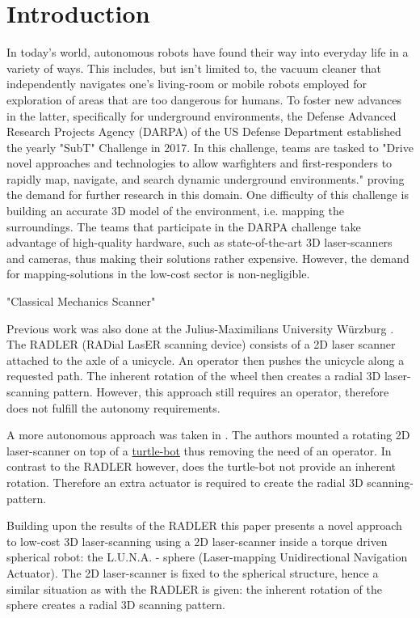 \section{Introduction}
\label{sec:introduction}

In today's world, autonomous robots have found their way into everyday life in a variety of ways. This includes, but isn't limited to, the vacuum cleaner that independently navigates one's living-room or mobile robots employed for exploration of areas that are too dangerous for humans. To foster new advances in the latter, specifically for underground environments, the  Defense Advanced Research Projects Agency (DARPA) of the US Defense Department established the yearly "SubT" Challenge in 2017. In this challenge, teams are tasked to "Drive novel approaches and technologies to allow warfighters and first-responders to rapidly map, navigate, and search dynamic underground environments."  \cite{allen} proving the demand for further research in this domain. One difficulty of this challenge is building an accurate 3D model of the environment, i.e. mapping the surroundings. The teams that participate in the DARPA challenge take advantage of high-quality hardware, such as state-of-the-art 3D laser-scanners and cameras, thus making their solutions rather expensive. However, the demand for mapping-solutions in the low-cost sector is non-negligible. 

"Classical Mechanics Scanner" \cite{classical_mechanics_scanner}

Previous work was also done at the Julius-Maximilians University W\"urzburg \cite{ISER2018}. The RADLER (RADial LasER scanning device) consists of a 2D laser scanner attached to the axle of a unicycle. An operator then pushes the unicycle along a requested path. The inherent rotation of the wheel then creates a radial 3D laser-scanning pattern. However, this approach still requires an operator, therefore does not fulfill the autonomy requirements. 

A more autonomous approach was taken in \cite{3D_per_2D_based}. The authors mounted a rotating 2D laser-scanner on top of a \href{https://www.turtlebot.com}{turtle-bot} thus removing the need of an operator. In contrast to the RADLER however, does the turtle-bot not provide an inherent rotation. Therefore an extra actuator is required to create the radial 3D scanning-pattern. 

Building upon the results of the RADLER  this paper presents a novel approach to low-cost 3D laser-scanning using a 2D laser-scanner inside a torque driven spherical robot: the L.U.N.A. - sphere (Laser-mapping Unidirectional Navigation Actuator). The 2D laser-scanner is fixed to the spherical structure, hence a similar situation as with the RADLER is given: the inherent rotation of the sphere creates a radial 3D scanning pattern. 
